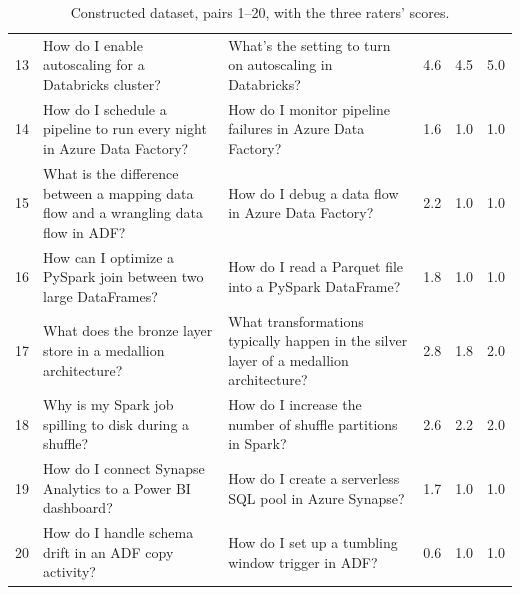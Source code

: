 \documentclass[11pt]{article}
\begin{document}
\begin{table}[t]
\begin{tabular}{rp{6.3cm}p{6.3cm}rrr}
13 & How do I enable autoscaling for a Databricks cluster? & What's the setting to turn on autoscaling in Databricks? & 4.6 & 4.5 & 5.0 \\
14 & How do I schedule a pipeline to run every night in Azure Data Factory? & How do I monitor pipeline failures in Azure Data Factory? & 1.6 & 1.0 & 1.0 \\
15 & What is the difference between a mapping data flow and a wrangling data flow in ADF? & How do I debug a data flow in Azure Data Factory? & 2.2 & 1.0 & 1.0 \\
16 & How can I optimize a PySpark join between two large DataFrames? & How do I read a Parquet file into a PySpark DataFrame? & 1.8 & 1.0 & 1.0 \\
17 & What does the bronze layer store in a medallion architecture? & What transformations typically happen in the silver layer of a medallion architecture? & 2.8 & 1.8 & 2.0 \\
18 & Why is my Spark job spilling to disk during a shuffle? & How do I increase the number of shuffle partitions in Spark? & 2.6 & 2.2 & 2.0 \\
19 & How do I connect Synapse Analytics to a Power BI dashboard? & How do I create a serverless SQL pool in Azure Synapse? & 1.7 & 1.0 & 1.0 \\
20 & How do I handle schema drift in an ADF copy activity? & How do I set up a tumbling window trigger in ADF? & 0.6 & 1.0 & 1.0 \\
\bottomrule
\end{tabular}
\caption{Constructed dataset, pairs 1--20, with the three raters' scores.}
\label{tab:data1}
\end{table}
\end{document}
